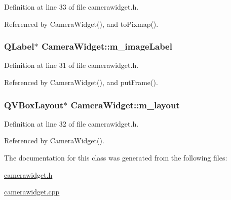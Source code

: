 Definition at line 33 of file camerawidget.\-h.



Referenced by Camera\-Widget(), and to\-Pixmap().

\hypertarget{classCameraWidget_aca76b8be07d57c2d715a685768dfcbe6}{
\subsubsection[{m\-\_\-image\-Label}]{\setlength{\rightskip}{0pt plus 5cm}Q\-Label$\ast$ Camera\-Widget\-::m\-\_\-image\-Label\hspace{0.3cm}{\ttfamily [private]}}}\label{classCameraWidget_aca76b8be07d57c2d715a685768dfcbe6}


Definition at line 31 of file camerawidget.\-h.



Referenced by Camera\-Widget(), and put\-Frame().

\hypertarget{classCameraWidget_a22be3fef82e8e5c1e125b280ec1434df}{
\subsubsection[{m\-\_\-layout}]{\setlength{\rightskip}{0pt plus 5cm}Q\-V\-Box\-Layout$\ast$ Camera\-Widget\-::m\-\_\-layout\hspace{0.3cm}{\ttfamily [private]}}}\label{classCameraWidget_a22be3fef82e8e5c1e125b280ec1434df}


Definition at line 32 of file camerawidget.\-h.



Referenced by Camera\-Widget().



The documentation for this class was generated from the following files\-:\begin{DoxyCompactItemize}
\item 
\hyperlink{camerawidget_8h}{camerawidget.\-h}\item 
\hyperlink{camerawidget_8cpp}{camerawidget.\-cpp}\end{DoxyCompactItemize}
